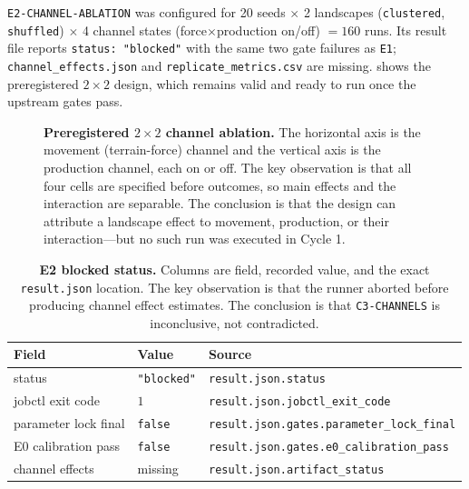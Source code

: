 \documentclass[11pt,a4paper]{article}
\newcommand{\code}[1]{\texttt{#1}}
\begin{document}
\code{E2-CHANNEL-ABLATION} was configured for 20 seeds $\times$ 2 landscapes
(\code{clustered}, \code{shuffled}) $\times$ 4 channel states
(force$\times$production on/off) $=160$ runs. Its result file reports
\code{status: "blocked"} with the same two gate failures as \code{E1};
\code{channel\_effects.json} and \code{replicate\_metrics.csv} are missing.
 shows the preregistered $2\times2$ design, which remains
valid and ready to run once the upstream gates pass.

\begin{figure}[htbp]
\centering
{}
\caption{\textbf{Preregistered $2\times2$ channel ablation.} The horizontal axis
is the movement (terrain-force) channel and the vertical axis is the production
channel, each on or off. The key observation is that all four cells are
specified before outcomes, so main effects and the interaction are separable.
The conclusion is that the design can attribute a landscape effect to movement,
production, or their interaction---but no such run was executed in Cycle 1.}
\label{fig:channels}
\end{figure}

\begin{table}[htbp]
\centering
\small
\begin{tabular}{@{}lll@{}}
\toprule
\textbf{Field} & \textbf{Value} & \textbf{Source} \\
\midrule
status & \code{"blocked"} & \code{result.json.status} \\
jobctl exit code & $1$ & \code{result.json.jobctl\_exit\_code} \\
parameter lock final & \code{false} & \code{result.json.gates.parameter\_lock\_final} \\
E0 calibration pass & \code{false} & \code{result.json.gates.e0\_calibration\_pass} \\
channel effects & missing & \code{result.json.artifact\_status} \\
\bottomrule
\end{tabular}
\caption{\textbf{E2 blocked status.} Columns are field, recorded value, and the
exact \code{result.json} location. The key observation is that the runner
aborted before producing channel effect estimates. The conclusion is that
\code{C3-CHANNELS} is inconclusive, not contradicted.}
\label{tab:e2-block}
\end{table}
\end{document}
